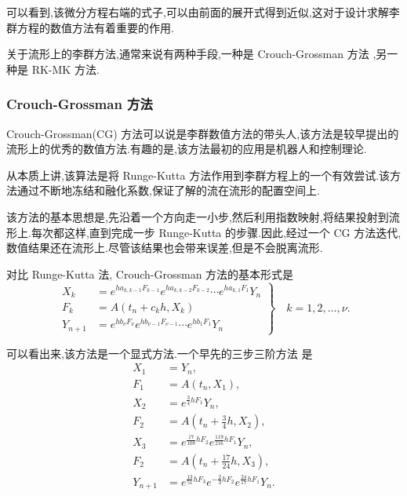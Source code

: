 可以看到,该微分方程右端的式子,可以由前面的展开式得到近似,这对于设计求解李群方程的数值方法有着重要的作用.

关于流形上的李群方法,通常来说有两种手段,一种是 Crouch-Grossman 方法 \cite{crouch1993numerical,klein2013numerical,munthe2013onpost,sonneville2014geome,bras2011anonlinear,kroshko2011integrating} ,另一种是 RK-MK \cite{arieh2005liegroup} 方法.

\subsubsection{Crouch-Grossman 方法}
Crouch-Grossman(CG) 方法可以说是李群数值方法的带头人,该方法是较早提出的流形上的优秀的数值方法.有趣的是,该方法最初的应用是机器人和控制理论.

从本质上讲,该算法是将 Runge-Kutta 方法作用到李群方程上的一个有效尝试.该方法通过不断地冻结和融化系数,保证了解的流在流形的配置空间上.

该方法的基本思想是,先沿着一个方向走一小步,然后利用指数映射,将结果投射到流形上.每次都这样,直到完成一步 Runge-Kutta 的步骤.因此,经过一个 CG 方法迭代,数值结果还在流形上.尽管该结果也会带来误差,但是不会脱离流形.

对比 Runge-Kutta 法, Crouch-Grossman 方法的基本形式是
\begin{equation*}
\left.\begin{aligned}
		X_k&=e^{ha_{k,k-1}F_{k-1}}e^{ha_{k,k-2}F_{k-2}}\cdots e^{ha_{k,1}F_{1}}Y_n\\
		F_k&=A(t_n+c_kh,X_k)\\
		Y_{n+1}&=e^{hb_{\nu}F_{\nu}}e^{hb_{\nu-1}F_{\nu-1}}\cdots e^{hb_{1}F_{1}}Y_n
	\end{aligned}\right\rbrace\quad k=1,2,\ldots,\nu.
\end{equation*}

可以看出来,该方法是一个显式方法.一个早先的三步三阶方法 \cite{crouch1993numerical} 是
\begin{equation*}
	\begin{aligned}
		X_1&=Y_n,\\
		F_1&=A(t_n,X_1),\\
		X_2&=e^{\frac{3}{4}hF_1}Y_n,\\
		F_2&=A(t_n+\frac{3}{4}h,X_2),\\
		X_3&=e^{\frac{17}{108}hF_2}e^{\frac{119}{216}hF_1}Y_n,\\
		F_2&=A(t_n+\frac{17}{24}h,X_3),\\
		Y_{n+1}&=e^{\frac{13}{51}hF_3}e^{-\frac{2}{3}hF_2}e^{\frac{24}{17}hF_1}Y_n.
	\end{aligned}
\end{equation*}

